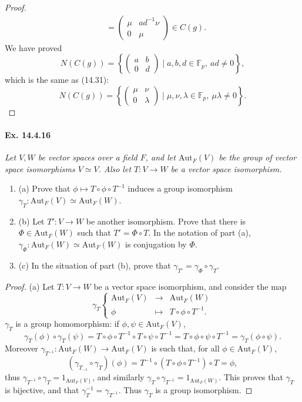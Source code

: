 \documentclass[11pt,a4paper]{article}
\newcommand{\be} {\begin{enumerate}}
\newcommand{\ee} {\end{enumerate}}
\newcommand{\F}{\mathbb{F}}
\begin{document}
{\begin{proof}
\begin{align*}
&=\begin{pmatrix} \mu  & ad^{-1}\nu\\ 0 & \mu  \end{pmatrix} \in C(g).
\end{align*}
We have proved
$$N(C(g)) =  \left\{\begin{pmatrix} a & b \\0 & d \end{pmatrix} \mid a,b,d \in \F_p,\ ad\ne 0\right\},$$
which is the same as (14.31):
$$N(C(g)) =  \left\{\begin{pmatrix} \mu & \nu\\ 0 & \lambda \end{pmatrix} \mid \mu,\nu,\lambda \in \F_p,\  \mu \lambda \ne 0\right\}.$$
\end{proof}

\paragraph{Ex. 14.4.16}{\it Let $V,W$ be vector spaces over a field $F$, and let $\mathrm{Aut}_F(V)$ be the group of vector space isomorphisms $V \simeq V$. Also let $T : V \to W$ be a vector space isomorphism.
\be
\item[(a)] Prove that $\phi \mapsto T \circ \phi \circ T^{-1}$ induces a group isomorphism $\gamma_T : \mathrm{Aut}_F(V) \simeq \mathrm{Aut}_F(W)$.
\item[(b)] Let $T' : V\to W$ be another isomorphism. Prove that there is $\Phi \in \mathrm{Aut}_F(W)$ such that $T'= \Phi \circ T$. In the notation of part (a), $\gamma_\Phi : \mathrm{Aut}_F(W) \simeq \mathrm{Aut}_F(W)$ is conjugation by $\Phi$.
\item[(c)] In the situation of part (b), prove that $\gamma_{T'} = \gamma_\Phi \circ \gamma_T$.
\ee
}

\begin{proof}
\item[(a)] Let $ T : V \to W$ be a vector space isomorphism, and consider the map
$$
\gamma_T
\left\{
\begin{array}{ccc}
\mathrm{Aut}_F(V) & \to &\mathrm{Aut}_F(W)\\
\phi & \mapsto & T \circ \phi \circ T^{-1}.
\end{array}
\right.
$$
$\gamma_T$ is a group homomorphism: if $\phi,\psi \in \mathrm{Aut}_F(V)$,
$$ \gamma_T(\phi)\circ \gamma_T(\psi) = T \circ \phi \circ T^{-1} \circ T \circ \psi \circ T^{-1} = T \circ \phi \circ \psi \circ T^{-1} = \gamma_T(\phi \circ \psi).$$
Moreover $\gamma_{T^{-1} } : \mathrm{Aut}_F(W) \to \mathrm{Aut}_F(V)$ is such that, for all $\phi \in \mathrm{Aut}_F(V)$,
$$(\gamma_{T_{-1}} \circ \gamma_T)(\phi) =  T^{-1} \circ (T \circ \phi \circ T^{-1}) \circ T = \phi,$$
thus $\gamma_{T^{-1}} \circ \gamma_T = 1_{\mathrm{Aut}_F(V)}$, and similarly $\gamma_{T} \circ \gamma_{T^{-1}}= 1_{\mathrm{Aut}_F(W)}$. This proves that $\gamma_T$ is bijective, and that $\gamma_T^{-1} = \gamma_{T^{-1}}$. Thus $\gamma_T$ is a group isomorphism.


\end{proof}}
\end{document}
